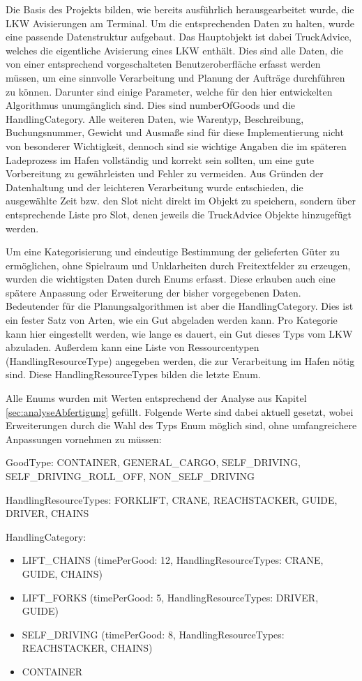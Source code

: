 Die Basis des Projekts bilden, wie bereits ausführlich herausgearbeitet wurde, die LKW Avisierungen am Terminal. Um die entsprechenden Daten zu halten, wurde eine passende Datenstruktur aufgebaut. Das Hauptobjekt ist dabei TruckAdvice, welches die eigentliche Avisierung eines LKW enthält. Dies sind alle Daten, die von einer entsprechend vorgeschalteten Benutzeroberfläche erfasst werden müssen, um eine sinnvolle Verarbeitung und Planung der Aufträge durchführen zu können. Darunter sind einige Parameter, welche für den hier entwickelten Algorithmus unumgänglich sind. Dies sind numberOfGoods und die HandlingCategory. Alle weiteren Daten, wie Warentyp, Beschreibung, Buchungsnummer, Gewicht und Ausmaße sind für diese Implementierung nicht von besonderer Wichtigkeit, dennoch sind sie wichtige Angaben die im späteren Ladeprozess im Hafen vollständig und korrekt sein sollten, um eine gute Vorbereitung zu gewährleisten und Fehler zu vermeiden. Aus Gründen der Datenhaltung und der leichteren Verarbeitung wurde entschieden, die ausgewählte Zeit bzw. den Slot nicht direkt im Objekt zu speichern, sondern über entsprechende Liste pro Slot, denen jeweils die TruckAdvice Objekte hinzugefügt werden.

Um eine Kategorisierung und eindeutige Bestimmung der gelieferten Güter zu ermöglichen, ohne Spielraum und Unklarheiten durch Freitextfelder zu erzeugen, wurden die wichtigsten Daten durch Enums erfasst. Diese erlauben auch eine spätere Anpassung oder Erweiterung der bisher vorgegebenen Daten. Bedeutender für die Planungsalgorithmen ist aber die HandlingCategory. Dies ist ein fester Satz von Arten, wie ein Gut abgeladen werden kann. Pro Kategorie kann hier eingestellt werden, wie lange es dauert, ein Gut dieses Typs vom LKW abzuladen. Außerdem kann eine Liste von Ressourcentypen (HandlingResourceType) angegeben werden, die zur Verarbeitung im Hafen nötig sind. Diese HandlingResourceTypes bilden die letzte Enum.

Alle Enums wurden mit Werten entsprechend der Analyse aus Kapitel \ref{sec:analyseAbfertigung} gefüllt. Folgende Werte sind dabei aktuell gesetzt, wobei Erweiterungen durch die Wahl des Typs Enum möglich sind, ohne umfangreichere Anpassungen vornehmen zu müssen: 

GoodType: CONTAINER, GENERAL\_CARGO, SELF\_DRIVING, SELF\_DRIVING\_ROLL\_OFF, NON\_SELF\_DRIVING

HandlingResourceTypes: FORKLIFT, CRANE, REACHSTACKER, GUIDE, DRIVER, CHAINS

HandlingCategory: 
\begin{itemize}
    \item LIFT\_CHAINS (timePerGood: 12, HandlingResourceTypes: CRANE, GUIDE, CHAINS)
    \item LIFT\_FORKS (timePerGood: 5, HandlingResourceTypes: DRIVER, GUIDE)
    \item SELF\_DRIVING (timePerGood: 8, HandlingResourceTypes: REACHSTACKER, CHAINS)
    \item CONTAINER
\end{itemize}



